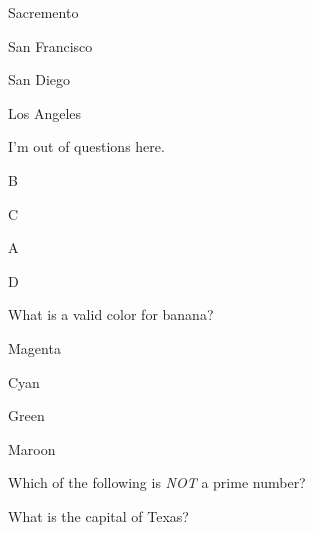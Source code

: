 \documentclass[12pt]{exam}
\begin{document}
\begin{questions}
        \begin{oneparchoices}
        
            \choice Sacremento
        
            \choice San Francisco
        
            \choice San Diego
        
            \choice Los Angeles
        
        \end{oneparchoices}

    \question I'm out of questions here.
    
        \begin{oneparchoices}
        
            \choice B
        
            \choice C
        
            \choice A
        
            \choice D
        
        \end{oneparchoices}

    \question What is a valid color for banana?
    
        \begin{oneparchoices}
        
            \choice Magenta
        
            \choice Cyan
        
            \choice Green
        
            \choice Maroon
        
        \end{oneparchoices}

    \question Which of the following is \textit{NOT} a prime number?
    
        \begin{oneparchoices}
        
        
        
        
        
        \end{oneparchoices}

    \question What is the capital of Texas?
    
        \begin{oneparchoices}
        

\end{oneparchoices}
\end{questions}
\end{document}
